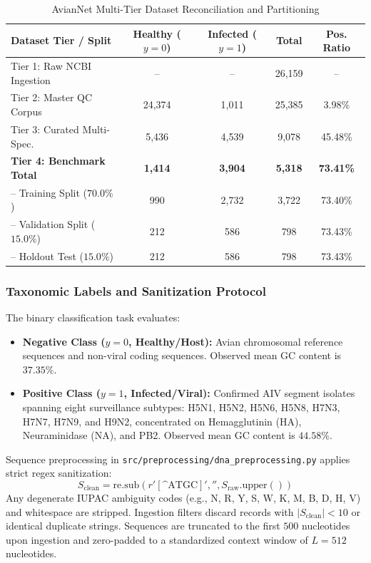 \documentclass[conference]{IEEEtran}
\begin{document}
\begin{table}[t]
  \centering
  \caption{AvianNet Multi-Tier Dataset Reconciliation and Partitioning}
  \label{tab:dataset_tiers}
  \begin{tabular}{lcccc}
    \toprule
    \textbf{Dataset Tier / Split} & \textbf{Healthy ($y{=}0$)} & \textbf{Infected ($y{=}1$)} & \textbf{Total} & \textbf{Pos. Ratio} \\
    \midrule
    Tier 1: Raw NCBI Ingestion   & --     & --    & 26,159 & -- \\
    Tier 2: Master QC Corpus     & 24,374 & 1,011 & 25,385 & 3.98\% \\
    Tier 3: Curated Multi-Spec.  & 5,436  & 4,539 &  9,078 & 45.48\% \\
    \midrule
    \textbf{Tier 4: Benchmark Total} & \textbf{1,414} & \textbf{3,904} & \textbf{5,318} & \textbf{73.41\%} \\
    \midrule
    -- Training Split ($70.0\%$)  &   990  & 2,732 &  3,722 & 73.40\% \\
    -- Validation Split ($15.0\%$)&   212  &   586 &    798 & 73.43\% \\
    -- Holdout Test ($15.0\%$)    &   212  &   586 &    798 & 73.43\% \\
    \bottomrule
  \end{tabular}
\end{table}

\subsubsection{Taxonomic Labels and Sanitization Protocol}
The binary classification task evaluates:
\begin{itemize}
    \item \textbf{Negative Class ($y = 0$, Healthy/Host):} Avian chromosomal reference sequences and non-viral coding sequences. Observed mean GC content is $37.35\%$.
    \item \textbf{Positive Class ($y = 1$, Infected/Viral):} Confirmed AIV segment isolates spanning eight surveillance subtypes: H5N1, H5N2, H5N6, H5N8, H7N3, H7N7, H7N9, and H9N2, concentrated on Hemagglutinin (HA), Neuraminidase (NA), and PB2. Observed mean GC content is $44.58\%$.
\end{itemize}

Sequence preprocessing in \texttt{src/preprocessing/dna_preprocessing.py} applies strict regex sanitization:
\begin{equation}
    S_{\text{clean}} = \text{re.sub}(r'[\text{\textasciicircum ATGC}]', '', S_{\text{raw}}.\text{upper}())
    \label{eq:sanitize}
\end{equation}
Any degenerate IUPAC ambiguity codes (e.g., N, R, Y, S, W, K, M, B, D, H, V) and whitespace are stripped. Ingestion filters discard records with $|S_{\text{clean}}| < 10$ or identical duplicate strings. Sequences are truncated to the first $500$ nucleotides upon ingestion and zero-padded to a standardized context window of $L = 512$ nucleotides.
\end{document}
